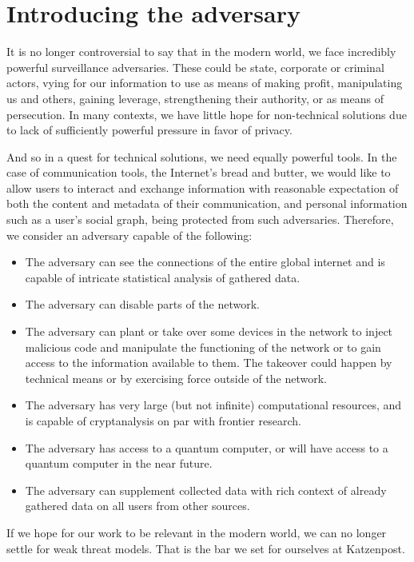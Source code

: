 \documentclass{article}
\begin{document}
\section{Introducing the adversary}

It is no longer controversial to say that in the modern world, we face incredibly powerful surveillance adversaries. These could be state, corporate or criminal actors, vying for our information to use as means of making profit, manipulating us and others, gaining leverage, strengthening their authority, or as means of persecution. In many contexts, we have little hope for non-technical solutions due to lack of sufficiently powerful pressure in favor of privacy.

And so in a quest for technical solutions, we need equally powerful tools. In the case of communication tools, the Internet's bread and butter, we would like to allow users to interact and exchange information with reasonable expectation of both the content and metadata of their communication, and personal information such as a user's social graph, being protected from such adversaries. Therefore, we consider an adversary capable of the following:
\begin{itemize}
\item The adversary can see the connections of the entire global internet and is capable of intricate statistical analysis of gathered data.
\item The adversary can disable parts of the network.
\item The adversary can plant or take over some devices in the network to inject malicious code and manipulate the functioning of the network or to gain access to the information available to them. The takeover could happen by technical means or by exercising force outside of the network.
\item The adversary has very large (but not infinite) computational resources, and is capable of cryptanalysis on par with frontier research.
\item The adversary has access to a quantum computer, or will have access to a quantum computer in the near future.
\item The adversary can supplement collected data with rich context of already gathered data on all users from other sources.
\end{itemize}

If we hope for our work to be relevant in the modern world, we can no longer settle for weak threat models. That is the bar we set for ourselves at Katzenpost.
\end{document}
